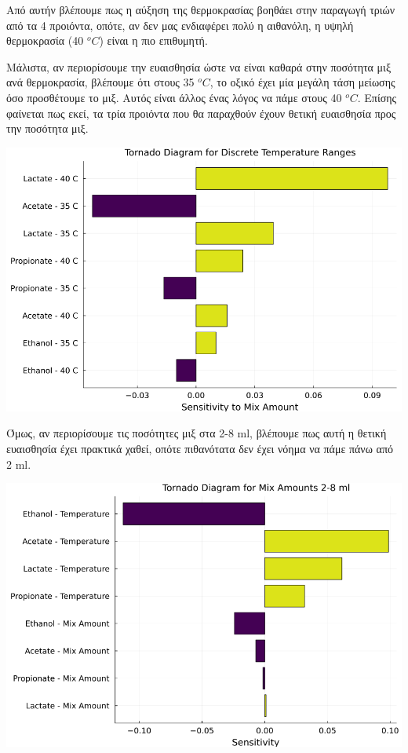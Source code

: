 \documentclass[11pt]{article}
\begin{document}
Από αυτήν βλέπουμε πως η αύξηση της θερμοκρασίας βοηθάει στην παραγωγή τριών από τα 4 προιόντα, οπότε, αν δεν μας ενδιαφέρει πολύ η αιθανόλη, η υψηλή θερμοκρασία (40 \(^oC\)) είναι η πιο επιθυμητή.

Μάλιστα, αν περιορίσουμε την ευαισθησία ώστε να είναι καθαρά στην ποσότητα μιξ ανά θερμοκρασία, βλέπουμε ότι στους 35 \(^oC\), το οξικό έχει μία μεγάλη τάση μείωσης όσο προσθέτουμε το μιξ. Αυτός είναι άλλος ένας λόγος να πάμε στους 40 \(^oC\). Επίσης φαίνεται πως εκεί, τα τρία προιόντα που θα παραχθούν έχουν θετική ευαισθησία προς την ποσότητα μιξ.

\begin{center}
\includegraphics[width=.9\linewidth]{../plots/sensitivity/temperature_tornado.png}
\end{center}

Όμως, αν περιορίσουμε τις ποσότητες μιξ στα 2-8 ml, βλέπουμε πως αυτή η θετική ευαισθησία έχει πρακτικά χαθεί, οπότε πιθανότατα δεν έχει νόημα να πάμε πάνω από 2 ml.
\begin{center}
\includegraphics[width=.9\linewidth]{../plots/sensitivity/tornado_high.png}
\end{center}
\end{document}
